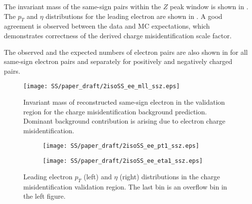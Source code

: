The invariant mass of the same-sign pairs within the $Z$ peak window is shown in . 
The $p_T$ and $\eta$ distributions for the leading electron are shown in .
A good agreement is observed between the data and MC expectations, which demonstrates correctness of the derived charge misidentification scale factor.

The observed and the expected numbers of electron pairs are also shown in  for all same-sign electron pairs and separately for positively and negatively charged pairs.

\begin{figure}[h]
\begin{center}
\texttt{[image: SS/paper\_draft/2isoSS\_ee\_mll\_ssz.eps]}
\caption{Invariant mass of reconstructed same-sign electron in the validation region for the charge misidentification background prediction.
Dominant background contribution is arising due to electron charge misidentification.
}
\label{fig:charge_flip_CR_inv_mass}
\end{center}
\end{figure} 

\begin{figure}
\begin{subfigure}{.5\textwidth}
  \centering
  \texttt{[image: SS/paper\_draft/2isoSS\_ee\_pt1\_ssz.eps]}
\end{subfigure}%
\begin{subfigure}{.5\textwidth}
  \centering
  \texttt{[image: SS/paper\_draft/2isoSS\_ee\_eta1\_ssz.eps]}
\end{subfigure}
\caption{Leading electron $p_T$ (left) and $\eta$ (right) distributions in the charge misidentification validation region. The last bin is an overflow bin in the left figure.}
  \label{fig:charge_flip_CR_kinematics}
\end{figure}


